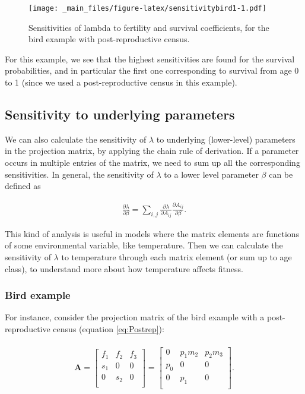 \documentclass[
]{book}
\begin{document}
\begin{figure}
\centering
\texttt{[image: \_main\_files/figure-latex/sensitivitybird1-1.pdf]}
\caption{\label{fig:sensitivitybird1}Sensitivities of lambda to fertility and survival coefficients, for the bird example with post-reproductive census.}
\end{figure}

For this example, we see that the highest sensitivities are found for the survival probabilities, and in particular the first one corresponding to survival from age 0 to 1 (since we used a post-reproductive census in this example).

\hypertarget{sensitivity-to-underlying-parameters}{%
\subsection{Sensitivity to underlying parameters}\label{sensitivity-to-underlying-parameters}}

We can also calculate the sensitivity of \(\lambda\) to underlying (lower-level) parameters in the projection matrix, by applying the chain rule of derivation. If a parameter occurs in multiple entries of the matrix, we need to sum up all the corresponding sensitivities. In general, the sensitivity of \(\lambda\) to a lower level parameter \(\beta\) can be defined as

\begin{align}
\frac{\partial \lambda}{\partial \beta}=\sum_{i,j} \frac{\partial \lambda}{\partial A_{ij}} \frac{\partial A_{ij}}{\partial \beta}.
\end{align}

This kind of analysis is useful in models where the matrix elements are functions of some environmental variable, like temperature. Then we can calculate the sensitivity of \(\lambda\) to temperature through each matrix element (or sum up to age class), to understand more about how temperature affects fitness.

\hypertarget{bird-example-12}{%
\subsubsection*{Bird example}\label{bird-example-12}}

For instance, consider the projection matrix of the bird example with a post-reproductive census (equation \eqref{eq:Postrep}):

\begin{align}
\begin{split}
\mathbf{A}=\left[\begin{matrix} f_1 & f_2 &f_3  \\ s_1 &0&0\\ 0 & s_2 &0  \\  \end{matrix}\right]=\left[\begin{matrix} 0 & p_1m_2 &p_2m_3  \\ p_0 &0&0\\ 0 & p_1 &0  \\  \end{matrix}\right].
\end{split}
\end{align}
\end{document}
